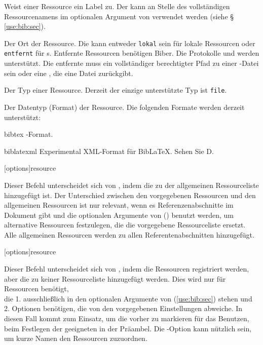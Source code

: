 \documentclass{ltxdockit}[2011/03/25]
\newcommand*{\biber}{Biber\xspace}
\newcommand*{\biblatex}{BibLaTeX\xspace}
\begin{document}
\begin{ltxsyntax}
\begin{optionlist*}

Weist  einer Ressource ein Label zu. Der  kann an Stelle des
vollständigen Ressourcenamens im optionalen Argument von 
verwendet werden (siehe § \ref{use:bib:sec}).


Der Ort der Ressource. Die  kann entweder \texttt{lokal} sein für
lokale Ressourcen oder \texttt{entfernt} für s. Entfernte Ressourcen
benötigen \biber. Die Protokolle  und  werden unterstützt. Die
entfernte  muss ein vollständiger berechtigter Pfad zu einer
-Datei sein oder eine , die eine  Datei zurückgibt.     


Der Typ einer Ressource. Derzeit der einzige unterstützte Typ ist
\texttt{file}. 


Der Datentyp (Format) der Ressource. Die folgenden Formate werden derzeit
unterstützt: 

\begin{valuelist}

\item[bibtex] \bibtex-Format.

\item[biblatexml] Experimental XML-Format für 
\biblatex. Sehen Sie D. %

\end{valuelist}

\end{optionlist*}

[options]{resource}

Dieser Befehl unterscheidet sich von , indem die
 zu der allgemeinen Ressourceliste hinzugefügt ist. Der
Unterschied zwischen den vorgegebenen Ressourcen und den allgemeinen Ressourcen
ist nur relevant, wenn es Referenzenabschnitte im Dokument gibt und die
optionalen Argumente von  () benutzt
werden, 
um alternative Ressourcen festzulegen, die die vorgegebene Ressourceliste
ersetzt. Alle allgemeinen Ressourcen werden zu allen Referentenabschnitten
hinzugefügt.

[options]{resource}

Dieser Befehl unterscheidet sich von , indem die
Ressourcen  registriert werden, aber die  zu keiner
Ressourceliste hinzugefügt werden. Dies wird nur für Ressourcen benötigt,\\
die 1. ausschließlich in den optionalen Argumente von 
(\ref{use:bib:sec}) stehen und \\
2. Optionen benötigen, die  von den
vorgegebenen Einstellungen abweiche. In diesen Fall kommt  zum
Einsatz, um die  vorher zu markieren für das Benutzen, beim
Festlegen der geeigneten  in der Präambel. Die -Option
kann nützlich sein, um kurze Namen den Ressourcen zuzuordnen.


\end{ltxsyntax}
\end{document}
